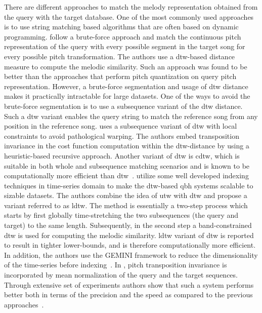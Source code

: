 There are different approaches to match the melody representation obtained from the query with the target database. One of the most commonly used approaches is to use string matching based algorithms that are often based on dynamic programming. \cite{mazzoni2001melody} follow a brute-force approach and match the continuous pitch representation of the query with every possible segment in the target song for every possible pitch transformation. The authors use a \gls{dtw}-based distance measure to compute the melodic similarity. Such an approach was found to be better than the approaches that perform pitch quantization on query pitch representation. However, a brute-force segmentation and usage of \gls{dtw} distance makes it practically intractable for large datasets. One of the ways to avoid the brute-force segmentation is to use a subsequence variant of the \gls{dtw} distance. Such a \gls{dtw} variant enables the query string to match the reference song from any position in the reference song. \cite{jang2000query} uses a subsequence variant of \gls{dtw} with local constraints to avoid pathological warping. The authors embed transposition invariance in the cost function computation within the \gls{dtw}-distance by using a heuristic-based recursive approach. Another variant of \gls{dtw} is \gls{cdtw}, which is suitable in both whole and subsequence matching scenarios and is known to be computationally more efficient than \gls{dtw}~\cite{lijffijt2010benchmarking}. \cite{zhu2003query} utilize some well developed indexing techniques in time-series domain to make the \gls{dtw}-based \gls{qbh} systems scalable to sizable datasets. The authors combine the idea of \gls{utw} with \gls{dtw} and propose a variant referred to as \gls{ldtw}. The method is essentially a two-step process which starts by first globally time-stretching the two subsequences (the query and target) to the same length. Subsequently, in the second step a band-constrained \gls{dtw} is used for computing the melodic similarity. \gls{ldtw} variant of \gls{dtw} is reported to result in tighter lower-bounds, and is therefore computationally more efficient. In addition, the authors use the GEMINI framework to reduce the dimensionality of the time-series before indexing~\cite{keogh2001dimensionality}. In \cite{zhu2003query}, pitch transposition invariance is incorporated by mean normalization of the query and the target sequences. Through extensive set of experiments authors show that such a system performs better both in terms of the precision and the speed as compared to the previous approaches~\citep{zhu2003query}. 

